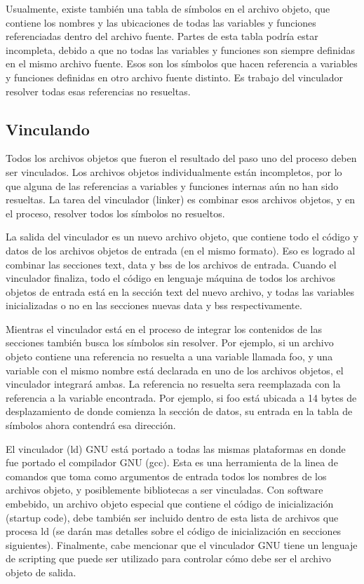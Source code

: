 \documentclass[output=paper, 
colorlinks,
citecolor=brown,
newtxmath
]{langscibook}
\begin{document}
Usualmente, existe también una tabla de símbolos en el archivo objeto, que contiene
los nombres y las ubicaciones de todas las variables y funciones referenciadas dentro
del archivo fuente. Partes de esta tabla podría estar incompleta, debido a que
no todas las variables y funciones son siempre definidas en el mismo archivo fuente. 
Esos son los símbolos que hacen referencia a variables y funciones definidas en 
otro archivo fuente distinto. Es trabajo del vinculador resolver todas esas referencias
no resueltas.

\subsection {Vinculando}

Todos los archivos objetos que fueron el resultado del paso uno del proceso deben
ser vinculados. Los archivos objetos individualmente están incompletos, por lo que
alguna de las referencias a variables y funciones internas aún no han sido resueltas.
La tarea del vinculador (linker) es combinar esos archivos objetos, y en el proceso,
resolver todos los símbolos no resueltos.

La salida del vinculador es un nuevo archivo objeto, que contiene todo el código y datos
de los archivos objetos de entrada (en el mismo formato).
Eso es logrado al combinar las secciones text, data y bss de los archivos de entrada.
Cuando el vinculador finaliza, todo el código en lenguaje máquina de todos los archivos
objetos de entrada está en la sección text del nuevo archivo, y todas las variables
inicializadas o no en las secciones nuevas data y bss respectivamente.

Mientras el vinculador está en el proceso de integrar 
los contenidos de las secciones también 
busca los símbolos sin resolver. Por ejemplo, si un archivo objeto contiene 
una referencia no resuelta a  una variable llamada foo, y una variable con 
el mismo nombre está declarada en uno de los archivos objetos, el vinculador
integrará ambas. La referencia no resuelta sera reemplazada con la referencia
a la variable encontrada. Por ejemplo, si foo está ubicada a 14 bytes de desplazamiento
de donde comienza la sección de datos, su entrada en la tabla de símbolos ahora
contendrá esa dirección.

El vinculador (ld) GNU está portado a todas las mismas plataformas en donde
fue portado el compilador GNU (gcc). Esta es una herramienta de la linea de comandos
que toma como argumentos de entrada todos los nombres de los archivos objeto, 
y posiblemente bibliotecas a ser vinculadas.
Con software embebido, un archivo objeto especial que contiene el código de 
inicialización (startup code), debe también ser incluido dentro de esta
lista de archivos que procesa ld (se darán mas detalles sobre el código
de inicialización en secciones siguientes). Finalmente, cabe mencionar
que el vinculador GNU tiene un lenguaje de scripting que puede ser utilizado
para controlar cómo debe ser el archivo objeto de salida.
\end{document}
